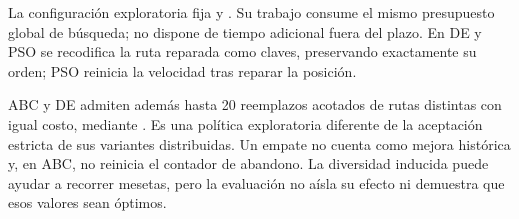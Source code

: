 La configuración exploratoria fija  y . Su trabajo consume el mismo presupuesto global de búsqueda; no dispone de tiempo adicional fuera del plazo. En DE y PSO se recodifica la ruta reparada como claves, preservando exactamente su orden; PSO reinicia la velocidad tras reparar la posición.

ABC y DE admiten además hasta 20 reemplazos acotados de rutas distintas con igual costo, mediante . Es una política exploratoria diferente de la aceptación estricta de sus variantes distribuidas. Un empate no cuenta como mejora histórica y, en ABC, no reinicia el contador de abandono. La diversidad inducida puede ayudar a recorrer mesetas, pero la evaluación no aísla su efecto ni demuestra que esos valores sean óptimos.
